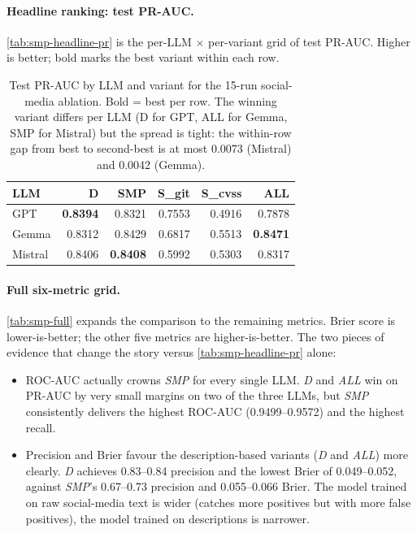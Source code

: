 \documentclass[11pt,a4paper]{article}
\begin{document}
\paragraph{Headline ranking: test PR-AUC.}
\autoref{tab:smp-headline-pr} is the per-LLM
$\times$ per-variant grid of test PR-AUC. Higher is
better; bold marks the best variant within each row.

\begin{table}[!htbp]
\centering\small
\setlength{\tabcolsep}{8pt}
\begin{tabular}{l r r r r r}
\toprule
LLM     & D & SMP & S\_git & S\_cvss & ALL \\
\midrule
GPT     & \textbf{0.8394} & 0.8321          & 0.7553 & 0.4916 & 0.7878          \\
Gemma   & 0.8312          & 0.8429          & 0.6817 & 0.5513 & \textbf{0.8471} \\
Mistral & 0.8406          & \textbf{0.8408} & 0.5992 & 0.5303 & 0.8317          \\
\bottomrule
\end{tabular}
\caption{Test PR-AUC by LLM and variant for the
15-run social-media ablation. Bold = best per row. The
winning variant differs per LLM (D for GPT, ALL for Gemma,
SMP for Mistral) but the spread is tight: the within-row
gap from best to second-best is at most 0.0073 (Mistral)
and 0.0042 (Gemma).}
\label{tab:smp-headline-pr}
\end{table}

\paragraph{Full six-metric grid.}
\autoref{tab:smp-full} expands the comparison to the
remaining metrics. Brier score is lower-is-better; the
other five metrics are higher-is-better. The two pieces
of evidence that change the story versus
\autoref{tab:smp-headline-pr} alone:
\begin{itemize}[leftmargin=*, itemsep=0pt]
    \item ROC-AUC actually crowns \emph{SMP} for every
    single LLM. \emph{D} and \emph{ALL} win on PR-AUC by
    very small margins on two of the three LLMs, but
    \emph{SMP} consistently delivers the highest ROC-AUC
    (0.9499--0.9572) and the highest recall.
    \item Precision and Brier favour the description-based
    variants (\emph{D} and \emph{ALL}) more clearly.
    \emph{D} achieves 0.83--0.84 precision and the lowest
    Brier of 0.049--0.052, against \emph{SMP}'s 0.67--0.73
    precision and 0.055--0.066 Brier. The model trained on
    raw social-media text is wider (catches more positives
    but with more false positives), the model trained on
    descriptions is narrower.
\end{itemize}
\end{document}
